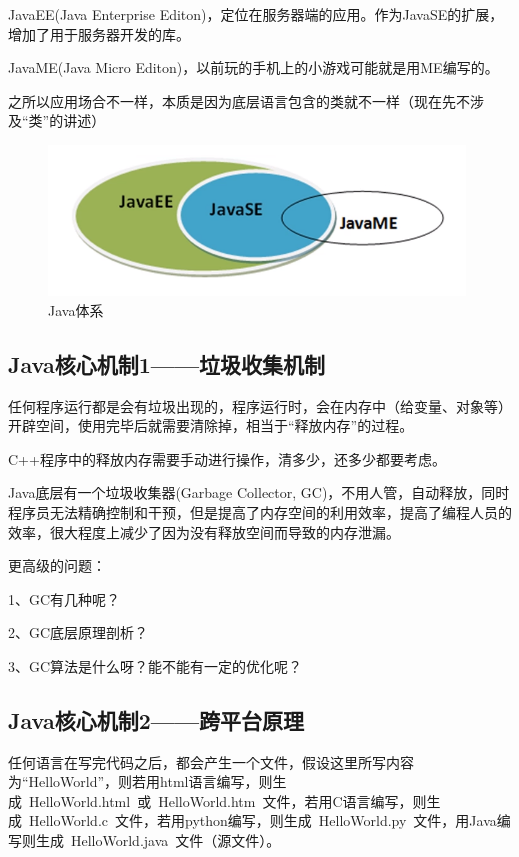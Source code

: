 \documentclass{article}
\begin{document}
	JavaEE(Java Enterprise Editon)，定位在服务器端的应用。作为JavaSE的扩展，增加了用于服务器开发的库。
	
	JavaME(Java Micro Editon)，以前玩的手机上的小游戏可能就是用ME编写的。
	
	之所以应用场合不一样，本质是因为底层语言包含的类就不一样（现在先不涉及“类”的讲述）
	
	\begin{figure}[ht]
	\centering
	\includegraphics[height=40mm]{2.png}
	\caption{Java体系}
	\label{fig:label}
	\end{figure}	
	
	\subsection{Java核心机制1——垃圾收集机制}
	任何程序运行都是会有垃圾出现的，程序运行时，会在内存中（给变量、对象等）开辟空间，使用完毕后就需要清除掉，相当于“释放内存”的过程。
	
	C++程序中的释放内存需要手动进行操作，清多少，还多少都要考虑。
	
	Java底层有一个垃圾收集器(Garbage Collector, GC)，不用人管，自动释放，同时程序员无法精确控制和干预，但是提高了内存空间的利用效率，提高了编程人员的效率，很大程度上减少了因为没有释放空间而导致的内存泄漏。
	
	更高级的问题：
	
	1、GC有几种呢？
	
	2、GC底层原理剖析？
	
	3、GC算法是什么呀？能不能有一定的优化呢？

	\subsection{Java核心机制2——跨平台原理}
	
	任何语言在写完代码之后，都会产生一个文件，假设这里所写内容为“HelloWorld”，则若用html语言编写，则生成\ HelloWorld.html\ 或\ HelloWorld.htm\ 文件，若用C语言编写，则生成\ HelloWorld.c\ 文件，若用python编写，则生成\ HelloWorld.py\ 文件，用Java编写则生成\ HelloWorld.java\ 文件（源文件）。
	
\end{document}
